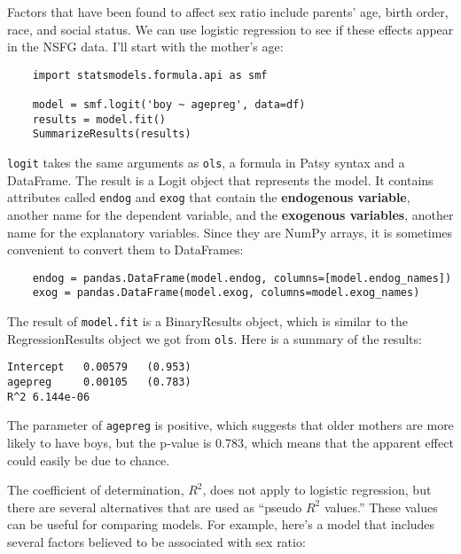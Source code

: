 Factors that have been found to affect sex ratio include parents'
age, birth order, race, and social status.  We can use logistic
regression to see if these effects appear in the NSFG data.  I'll
start with the mother's age:

\begin{verbatim}
    import statsmodels.formula.api as smf

    model = smf.logit('boy ~ agepreg', data=df)
    results = model.fit()
    SummarizeResults(results)
\end{verbatim}

{\tt logit} takes the same arguments as {\tt ols}, a formula
in Patsy syntax and a DataFrame.  The result is a Logit object
that represents the model.  It contains attributes called
{\tt endog} and {\tt exog} that contain the {\bf endogenous
variable}, another name for the dependent variable,
and the {\bf exogenous variables}, another name for the
explanatory variables.  Since they are NumPy arrays, it is
sometimes convenient to convert them to DataFrames:

\begin{verbatim}
    endog = pandas.DataFrame(model.endog, columns=[model.endog_names])
    exog = pandas.DataFrame(model.exog, columns=model.exog_names)
\end{verbatim}

The result of {\tt model.fit} is a BinaryResults object, which is
similar to the RegressionResults object we got from {\tt ols}.
Here is a summary of the results:

\begin{verbatim}
Intercept   0.00579   (0.953)
agepreg     0.00105   (0.783)
R^2 6.144e-06
\end{verbatim}

The parameter of {\tt agepreg} is positive, which suggests that
older mothers are more likely to have boys, but the p-value is
0.783, which means that the apparent effect could easily be due
to chance.

The coefficient of determination, $R^2$, does not apply to logistic
regression, but there are several alternatives that are used
as ``pseudo $R^2$ values.''  These values can be useful for comparing
models.  For example, here's a model that includes several factors
believed to be associated with sex ratio:

